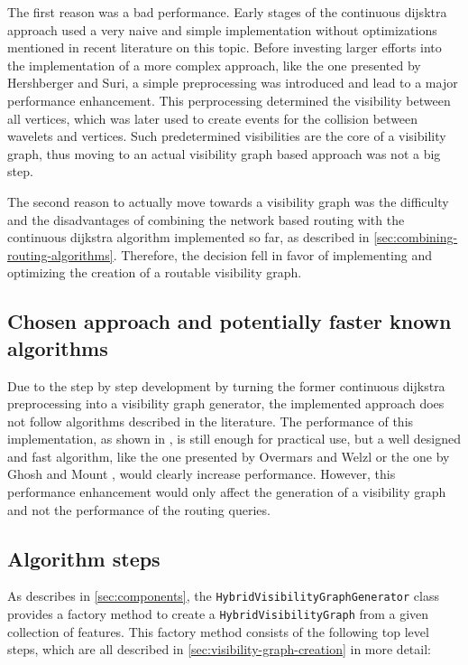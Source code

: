 		The first reason was a bad performance.
		Early stages of the continuous dijsktra approach used a very naive and simple implementation without optimizations mentioned in recent literature on this topic.
		Before investing larger efforts into the implementation of a more complex approach, like the one presented by Hershberger and Suri\cite{hershberger-suri}, a simple preprocessing was introduced and lead to a major performance enhancement.
		This perprocessing determined the visibility between all vertices, which was later used to create events for the collision between wavelets and vertices.
		Such predetermined visibilities are the core of a visibility graph, thus moving to an actual visibility graph based approach was not a big step.
		
		The second reason to actually move towards a visibility graph was the difficulty and the disadvantages of combining the network based routing with the continuous dijkstra algorithm implemented so far, as described in \cref{sec:combining-routing-algorithms}.
		Therefore, the decision fell in favor of implementing and optimizing the creation of a routable visibility graph.
	
	\subsection{Chosen approach and potentially faster known algorithms}

		Due to the step by step development by turning the former continuous dijkstra preprocessing into a visibility graph generator, the implemented approach does not follow algorithms described in the literature.
		The performance of this implementation, as shown in , is still enough for practical use, but a well designed and fast algorithm, like the one presented by Overmars and Welzl \cite{overmars-weizl-visibility-graph} or the one by Ghosh and Mount \cite{ghosh-output-sensitive-vgraph}, would clearly increase performance.
		However, this performance enhancement would only affect the generation of a visibility graph and not the performance of the routing queries.
			
	\subsection{Algorithm steps}
	\label{subsec:algorithm-steps}
		
		As describes in \cref{sec:components}, the \texttt{HybridVisibilityGraphGenerator} class provides a factory method to create a \texttt{HybridVisibilityGraph} from a given collection of features.
		This factory method consists of the following top level steps, which are all described in \cref{sec:visibility-graph-creation} in more detail:
		
